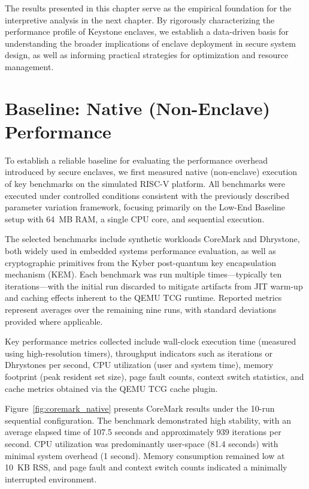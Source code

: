 The results presented in this chapter serve as the empirical foundation for the interpretive analysis in the next chapter. By rigorously characterizing the performance profile of Keystone enclaves, we establish a data-driven basis for understanding the broader implications of enclave deployment in secure system design, as well as informing practical strategies for optimization and resource management.

\section{Baseline: Native (Non-Enclave) Performance}
\label{sec:baseline-native}

To establish a reliable baseline for evaluating the performance overhead introduced by secure enclaves, we first measured native (non-enclave) execution of key benchmarks on the simulated RISC-V platform. All benchmarks were executed under controlled conditions consistent with the previously described parameter variation framework, focusing primarily on the Low-End Baseline setup with 64~MB RAM, a single CPU core, and sequential execution.

The selected benchmarks include synthetic workloads CoreMark and Dhrystone, both widely used in embedded systems performance evaluation, as well as cryptographic primitives from the Kyber post-quantum key encapsulation mechanism (KEM). Each benchmark was run multiple times---typically ten iterations---with the initial run discarded to mitigate artifacts from JIT warm-up and caching effects inherent to the QEMU TCG runtime. Reported metrics represent averages over the remaining nine runs, with standard deviations provided where applicable.

Key performance metrics collected include wall-clock execution time (measured using high-resolution timers), throughput indicators such as iterations or Dhrystones per second, CPU utilization (user and system time), memory footprint (peak resident set size), page fault counts, context switch statistics, and cache metrics obtained via the QEMU TCG cache plugin.

Figure~\ref{fig:coremark_native} presents CoreMark results under the 10-run sequential configuration. The benchmark demonstrated high stability, with an average elapsed time of 107.5 seconds and approximately 939 iterations per second. CPU utilization was predominantly user-space (81.4 seconds) with minimal system overhead (1 second). Memory consumption remained low at 10~KB RSS, and page fault and context switch counts indicated a minimally interrupted environment.

